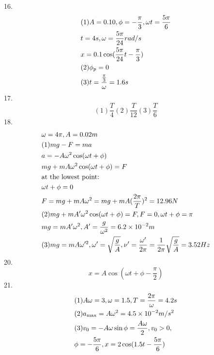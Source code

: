 \documentclass{article}
\begin{document}
16.\[\begin{gathered}
  (1)A = 0.10,\phi  =  - \frac{\pi }{3},\omega t = \frac{{5\pi }}{6} \hfill \\
  t = 4s,\omega  = \frac{{5\pi }}{{24}}rad/s \hfill \\
  x = 0.1\cos (\frac{{5\pi }}{{24}}t - \frac{\pi }{3}) \hfill \\
  (2){\phi _p} = 0 \hfill \\
  (3)t = \frac{{\frac{\pi }{3}}}{\omega } = 1.6s \hfill \\
\end{gathered} \]
17.\[(1)\frac{T}{4}(2)\frac{T}{{12}}(3)\frac{T}{6}\]
18.\[\begin{gathered}
  \omega  = 4\pi ,A = 0.02m \hfill \\
  (1)mg - F = ma \hfill \\
  a =  - A{\omega ^2}\cos (\omega t + \phi ) \hfill \\
  mg + mA{\omega ^2}\cos (\omega t + \phi ) = F \hfill \\
  {\text{at the lowest point:}} \hfill \\
  \omega t + \phi  = 0 \hfill \\
  F = mg + mA{\omega ^2} = mg + mA{(\frac{{2\pi }}{T})^2} = 12.96N \hfill \\
  (2)mg + mA'{\omega ^2}\cos (\omega t + \phi ) = F,F = 0,\omega t + \phi  = \pi  \hfill \\
  mg = mA'{\omega ^2},A' = \frac{g}{{{\omega ^2}}} = 6.2 \times {10^{ - 2}}m \hfill \\
  (3)mg = mA\omega {'^2},\omega ' = \sqrt {\frac{g}{A}} ,\nu ' = \frac{{\omega '}}{{2\pi }} = \frac{1}{{2\pi }}\sqrt {\frac{g}{A}}  = 3.52Hz \hfill \\
\end{gathered} \]
20.\[x = A\cos (\omega t + \phi  - \frac{\pi }{2})\]
21.\[\begin{gathered}
  (1)A\omega  = 3,\omega  = 1.5,T = \frac{{2\pi }}{\omega } = 4.2s \hfill \\
  (2){a_{\max }} = A{\omega ^2} = 4.5 \times {10^{ - 2}}m/{s^2} \hfill \\
  (3){v_0} =  - A\omega \sin \phi  = \frac{{A\omega }}{2},{v_0} > 0, \hfill \\
  \phi  =  - \frac{{5\pi }}{6},x = 2\cos (1.5t - \frac{{5\pi }}{6}) \hfill \\
\end{gathered} \]
\end{document}
